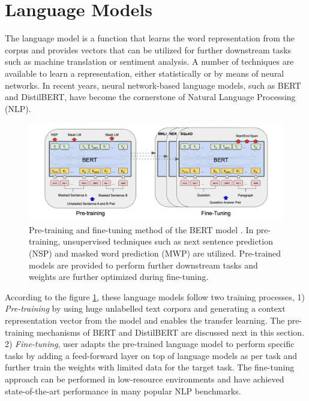 \documentclass[%
	BCOR=8mm, %
	DIV=12,
	toc=bibliography, %
	toc=listof, %
	oneside, %
	egregdoesnotlikesansseriftitles, %
	]{scrbook}
\begin{document}
\section{Language Models}
\label{section:langaugemodels}
The language model is a function that learns the word representation from the corpus and provides vectors that can be utilized for further downstream tasks such as machine translation or sentiment analysis. A number of techniques are available to learn a representation, either statistically or by means of neural networks. In recent years, neural network-based language models, such as BERT and DistilBERT, have become the cornerstone of Natural Language Processing (NLP). 
\begin{figure}[H]
    \centering
    \includegraphics[width=0.85\linewidth]{img/pre_fintune.png}
    \caption[Diagram of pre-training and fine-tuning of BERT model]{ \small Pre-training and fine-tuning method of the BERT model \cite{devlin_bert_2019-1}. In pre-training, unsupervised techniques such as next sentence prediction (NSP) and masked word prediction (MWP) are utilized. Pre-trained models are provided to perform further downstream tasks and weights are further optimized during fine-tuning.}
    \label{fig:prefintune}
\end{figure}
According to the figure \ref{fig:prefintune}, these language models follow two training processes, 1)\textit{ Pre-training} by using huge unlabelled text corpora and generating a context representation vector from the model \cite{devlin_bert_2019-1}  and enables the transfer learning. The pre-training mechanisms of BERT and DistilBERT are discussed next in this section. 2) \textit{Fine-tuning}, user adapts the pre-trained language model to perform specific tasks by adding a feed-forward layer on top of language models as per task and further train the weights with limited data for the target task. The fine-tuning approach can be performed in low-resource environments and have achieved state-of-the-art performance in many popular NLP benchmarks.
\end{document}
